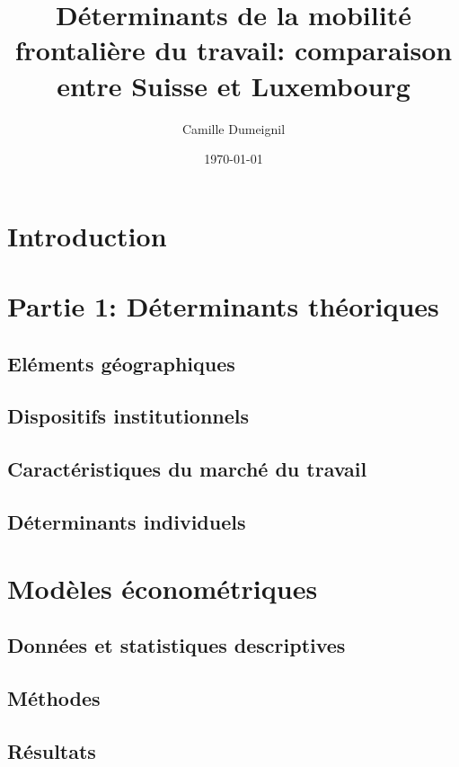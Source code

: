 \documentclass{article}
\title{Déterminants de la mobilité frontalière du travail: comparaison entre Suisse et Luxembourg}
\author{Camille Dumeignil}
\date{\today}
\begin{document}
\maketitle
\tableofcontents %

\section{Introduction}
\section{Partie 1: Déterminants théoriques}
\subsection{Eléments géographiques}
\subsection{Dispositifs institutionnels}
\subsection{Caractéristiques du marché du travail}
\subsection{Déterminants individuels}
\section{Modèles économétriques}
\subsection{Données et statistiques descriptives}
\subsection{Méthodes}
\subsection{Résultats}



\end{document}
